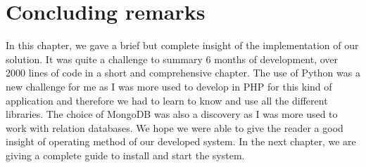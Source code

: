 \section{Concluding remarks}
In this chapter, we gave a brief but complete insight of the implementation of our solution. It was quite a challenge to summary 6 months of development, over 2000 lines of code in a short and comprehensive chapter. The use of Python was a new challenge for me as I was more used to develop in PHP for this kind of application and therefore we had to learn to know and use all the different libraries. The choice of MongoDB was also a discovery as I was more used to work with relation databases. We hope we were able to give the reader a good insight of operating method of our developed system. In the next chapter, we are giving a complete guide to install and start the system.
